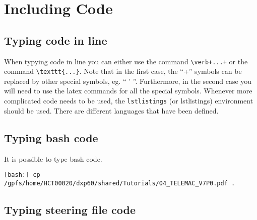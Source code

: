 \chapter{Including Code}

\section{Typing code in line}

When typying code in line you can either use the command \verb'\verb+...+' or
the command \texttt{\textbackslash{}texttt\{...\}}. Note that in the first
case, the ``+'' symbols can be replaced by other special symbols, eg. `` ' ''.
Furthermore, in the second case you will need to use the latex commands for all
the special symbols. Whenever more complicated code needs to be used, the
\texttt{lstlistings} (or {\ttfamily lstlistings}) environment should be used.
There are different languages that have been defined.

\section{Typing bash code}

It is possible to type bash code.

\lstset{language=bash,
        basicstyle=\scriptsize\ttfamily}

\begin{lstlisting}[frame=trBL,escapechar=|]
[bash:] cp /gpfs/home/HCT00020/dxp60/shared/Tutorials/04_TELEMAC_V7P0.pdf .
\end{lstlisting}

\section{Typing steering file code}

